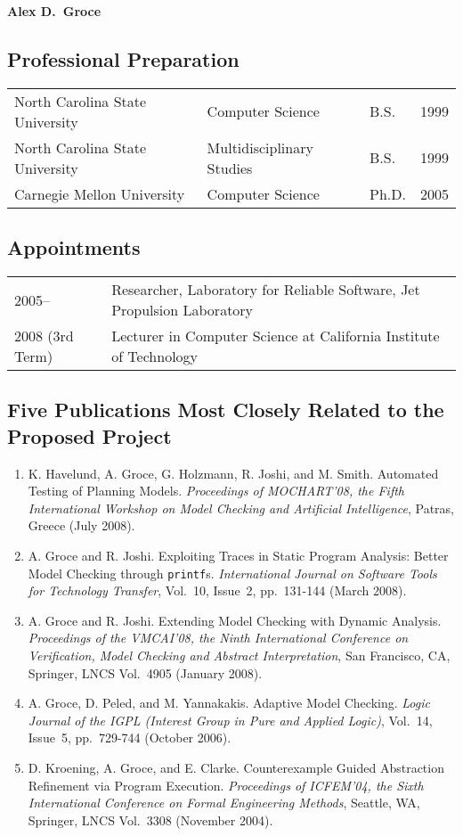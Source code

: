 \documentclass[fleqn,11pt]{article}
\newcommand{\sht}{\vspace{-.24in}}
\renewcommand{\$}[1]{$#1$}
\begin{document}
\begin{center}
{\Large\bf Alex D.\ Groce}
\end{center}

\subsection*{Professional Preparation}

\begin{tabular}{lllr}
North Carolina State University & Computer Science & B.S. & 1999\\
North Carolina State University & Multidisciplinary Studies & B.S. & 1999\\
Carnegie Mellon University & Computer Science & Ph.D. & 2005\\
\end{tabular}

\subsection*{Appointments}

\begin{tabular}{ll}
2005--     & Researcher, Laboratory for Reliable Software, Jet Propulsion Laboratory\\
2008 (3rd Term) & Lecturer in Computer Science at California Institute of Technology
\end{tabular}

\subsection*{Five Publications Most Closely Related to the Proposed
Project}
\begin{enumerate}
\item K. Havelund, A. Groce, G. Holzmann, R. Joshi, and M. Smith.  Automated Testing of Planning Models.  {\em Proceedings of MOCHART'08, the Fifth International Workshop on Model Checking and Artificial Intelligence\/}, Patras, Greece (July 2008).
\item A. Groce and R. Joshi.  Exploiting Traces in Static Program Analysis:  Better Model Checking through {\tt printf}s.  {\em International Journal on Software Tools for Technology Transfer\/}, Vol.~10, Issue~2, pp.~131-144 (March 2008).
\item A. Groce and R. Joshi.  Extending Model Checking with Dynamic Analysis.  {\em Proceedings of the VMCAI'08, the Ninth International Conference on Verification, Model Checking and Abstract Interpretation\/}, San Francisco, CA, Springer, LNCS Vol.~4905 (January 2008).
\item A. Groce, D. Peled, and M. Yannakakis.  Adaptive Model Checking.  {\em Logic Journal of the IGPL (Interest Group in Pure and Applied Logic)\/}, Vol.~14, Issue~5, pp.~729-744 (October 2006).
\item D. Kroening, A. Groce, and E. Clarke.  Counterexample Guided Abstraction Refinement via Program Execution.  {\em Proceedings of ICFEM'04, the Sixth International Conference on Formal Engineering Methods\/}, Seattle, WA, Springer, LNCS Vol.~3308 (November 2004).
\end{enumerate}
\end{document}
